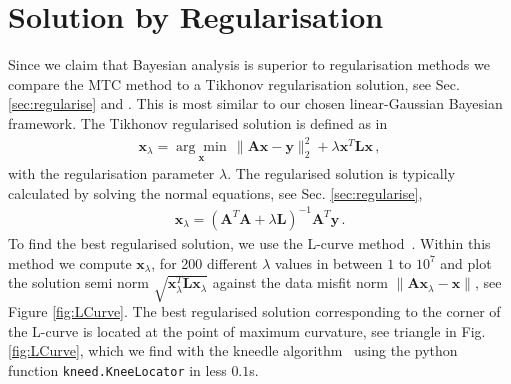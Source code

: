\section{Solution by Regularisation}
\label{sec:reg}
Since we claim that Bayesian analysis is superior to regularisation methods we compare the MTC method to a Tikhonov regularisation solution, see Sec. \ref{sec:regularise} and \cite{fox2016fast}.
This is most similar to our chosen linear-Gaussian Bayesian framework.
The Tikhonov regularised solution is defined as in~\cite{hansen2010discrete, fox2016fast} 
\begin{align}
	\bm{x}_{\lambda} =\underset{ \bm{x}}{\arg \min}\,  \lVert \bm{A}\bm{x} - \bm{y} \rVert_2^2 + \lambda \bm{x}^T \bm{L} \bm{x} \, ,
	\label{eq:XLam}
\end{align}
with the regularisation parameter $\lambda$.
The regularised solution is typically calculated by solving the normal equations, see Sec. \ref{sec:regularise},
\begin{align}
	\bm{x}_{\lambda} = (\bm{A}^T\bm{A} + \lambda \bm{L} )^{-1} \bm{A}^T \bm{y} \label{eq:xLam} \, .
\end{align}
To find the best regularised solution, we use the L-curve method~\cite{hansen1993use}.
Within this method we compute $\bm{x}_\lambda$, for 200 different $\lambda$ values in between $1$ to $10^7$ and plot the solution semi norm $\sqrt{\bm{x}_\lambda^T\mathbf{L} \bm{x}_\lambda}$ against the data misfit norm $\lVert \bm{A}\bm{x}_\lambda - \bm{x} \rVert$, see Figure \ref{fig:LCurve}. 
The best regularised solution corresponding to the corner of the L-curve is located at the point of maximum curvature, see triangle in Fig. \ref{fig:LCurve}, which we find with the kneedle algorithm~\cite{satopaa2011kneedle} using the python function \texttt{kneed.KneeLocator} in less $0.1$s.
